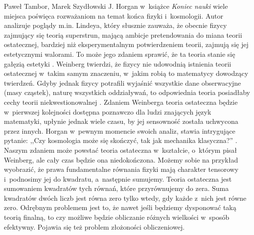 \begin{artplenv}{Paweł Tambor, Marek Szydłowski}
J. Horgan w~książce \textit{Koniec nauki}
\parencite*[][]{horgan_koniec_1999} %
 wiele miejsca poświęca rozważaniom na temat końca fizyki i~kosmologii. Autor analizuje poglądy m.in. Lindeya, który słusznie zauważa, że obecnie fizycy zajmujący się teorią superstrun, mającą ambicje pretendowania do miana teorii ostatecznej, bardziej niż eksperymentalnym potwierdzeniem teorii, zajmują się jej estetycznymi walorami. To może jego zdaniem sprawić, że ta teoria stanie się gałęzią estetyki 
\parencite[][s.~94]{horgan_koniec_1999}. %
 Weinberg twierdzi, że fizycy nie udowodnią istnienia teorii ostatecznej w~takim samym znaczeniu, w~jakim robią to matematycy dowodzący twierdzeń. Gdyby jednak fizycy potrafili wyjaśnić wszystkie dane obserwacyjne (masy cząstek), naturę wszystkich oddziaływań, to odpowiednia teoria posiadłaby cechy teorii niekwestionowalnej 
\parencite[][s.~99]{horgan_koniec_1999}. %
 Zdaniem Weinberga teoria ostateczna będzie w~pierwszej kolejności dostępna poznawczo dla ludzi znających język matematyki, upłynie jednak wiele czasu, by jej sensowność została uchwycona przez innych. Horgan w~pewnym momencie swoich analiz, stawia intrygujące pytanie: ,,Czy kosmologia może się skończyć, tak jak mechanika klasyczna?'' 
\parencite[][s.~134]{horgan_koniec_1999}. %
 Naszym zdaniem może powstać teoria ostateczna w~kształcie, o~którym pisał Weinberg, ale cały czas będzie ona niedokończona. Możemy sobie na przykład wyobrazić, że prawa fundamentalne równania fizyki mają charakter tensorowy i~podnosimy jej do kwadratu, a~następnie sumujemy. Teoria ostateczna jest sumowaniem kwadratów tych równań, które przyrównujemy do zera. Suma kwadratów dwóch liczb jest równa zero tylko wtedy, gdy każde z~nich jest równe zero. Odrębnym problemem jest to, że nawet jeśli będziemy dysponować taką teorią finalną, to czy możliwe będzie obliczanie różnych wielkości w~sposób efektywny. Pojawia się też problem złożoności obliczeniowej.


\end{artplenv}